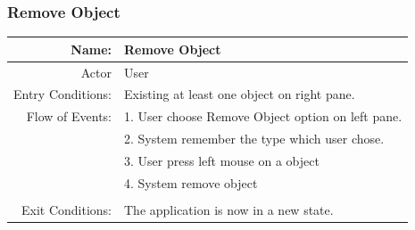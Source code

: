 \documentclass[a4paper,10pt]{article}
\begin{document}
\subsubsection{Remove Object}
	\begin{tabular}{|r|l|}
\hline
Name: & Remove Object \\
\hline
Actor & User \\
\hline
Entry Conditions: & Existing at least one object on right pane. \\
\hline
Flow of Events: & 1. User choose Remove Object option on left pane. \\
& 2. System remember the type which user chose.  \\
& 3. User press left mouse on a object  \\
& 4. System remove object  \\
\\
\hline
Exit Conditions: & The application is now in a new state. \\
\hline

\end{tabular}
	\paragraph{}

\newpage
{}
\printbibliography
\end{document}
